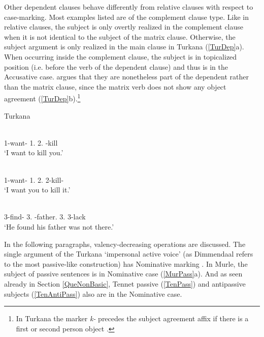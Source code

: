 Other dependent clauses behave differently from relative clauses with respect to case-marking. 
Most examples listed are of the complement clause type.
Like in relative clauses, the subject is only overtly realized in the complement clause when it is not identical to the subject of the matrix clause. 
Otherwise, the subject argument is only realized in the main clause in Turkana (\ref{TurDep}a).   
When occurring inside the complement clause, the subject is in topicalized position (i.e. before the verb of the dependent clause) and thus is in the Accusative case.  
\citet[374]{Dimmendaal:1982} argues that they are nonetheless part of the dependent rather than the matrix clause, since the matrix verb does not show any object agreement (\ref{TurDep}b).\footnote{In Turkana the marker \emph{k-} precedes the subject agreement affix if there is a first or second person object \citep[122]{Dimmendaal:1982}.}  

\begin{exe}\ex\label{TurDep} {Turkana} \citep[374]{Dimmendaal:1982}\nopagebreak[4]
\begin{xlist}
\ex\gll {} \textbf{}  \\
1\sg{}-want-\asp{} 1\sg{}.\nom{} 2\sg{}.\acc{} \Inf{}-kill\\
`I want to kill you.'
 
\ex\gll {}  \textbf{} \\
1\sg{}-want-\asp{} 1\sg{}.\nom{} 2\sg{}.\acc{} 2\sg{}-kill-\asp{}\\
`I want you to kill it.'

\ex\gll{}  \textbf{}  \\
3-find-\ventiv{} 3\sg{}.\nom{} \NC{}-father.\acc{} 3\sg{}.\poss{} 3-lack\\
`He found his father was not there.'
\end{xlist}
\end{exe}

In the following paragraphs, valency-decreasing operations are discussed.
The single argument of the {Turkana} `impersonal active voice' (as Dimmendaal refers to the most passive-like construction) has Nominative  marking \citep[132--133]{Dimmendaal:1982}. 
In Murle, the subject of passive sentences is in Nominative  case (\ref{MurPass}a).
And as seen already in Section \ref{QueNonBasic}, Tennet passive (\ref{TenPass}) and antipassive subjects (\ref{TenAntiPass}) also are in the Nominative  case. 

